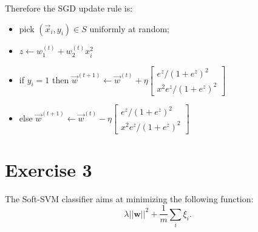 \documentclass[a4paper,11pt,oneside]{book}
\begin{document}
\begin{enumerate}
\begin{solution}
            Therefore the SGD update rule is:
            \begin{itemize}
            \item pick $(\vec{x}_i,y_i) \in S$ uniformly at random;
            \item $z \leftarrow w_1^{(t)}+w_2^{(t)}x_i^2$
            \item if $y_i=1$ then $\vec{w}^{(t+1)} \leftarrow \vec{w}^{(t)} + \eta\begin{bmatrix} e^z/(1+e^z)^2 \\ x^2e^z/(1+e^z)^2 \end{bmatrix}$
            \item else $\vec{w}^{(t+1)} \leftarrow \vec{w}^{(t)} - \eta\begin{bmatrix} e^z/(1+e^z)^2 \\ x^2e^z/(1+e^z)^2 \end{bmatrix}$
            \end{itemize}
        \end{solution}
\end{enumerate}

\section{Exercise 3}
The Soft-SVM classifier aims at minimizing the following function:  
\[
\lambda||\mathbf{w}||^2 + \frac{1}{m}\sum_i \xi_i.
\]
\end{document}
